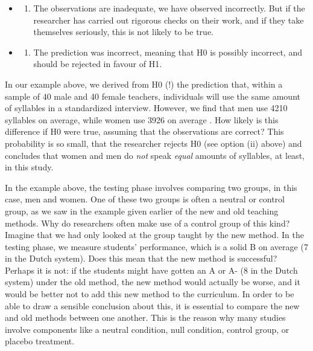 \documentclass[
]{book}
\providecommand{\tightlist}{%
  \setlength{\itemsep}{0pt}\setlength{\parskip}{0pt}}
\begin{document}
\begin{itemize}
\tightlist
\item
  \begin{enumerate}
  \def\labelenumi{(\roman{enumi})}
  \tightlist
  \item
    The observations are inadequate, we have observed incorrectly. But if the researcher has carried out rigorous checks on their work, and if they take themselves seriously, this is not likely to be true.
  \end{enumerate}
\item
  \begin{enumerate}
  \def\labelenumi{(\roman{enumi})}
  \setcounter{enumi}{1}
  \tightlist
  \item
    The prediction was incorrect, meaning that H0 is possibly incorrect, and should be rejected in favour of H1.
  \end{enumerate}
\end{itemize}

In our example above, we derived from H0 (!) the prediction that, within a sample of 40 male and 40 female teachers, individuals will use the same amount of syllables in a standardized interview. However, we find that men use 4210 syllables on average, while women use 3926 on average \citep[p.1112]{Quene08}. How likely is this difference if H0 were true, assuming that the observations are correct? This probability is so small, that the researcher rejects H0 (see option (ii) above) and concludes that women and men do \emph{not} speak \emph{equal} amounts of syllables, at least, in this study.

In the example above, the testing phase involves comparing two groups, in this case, men and women. One of these two groups is often a neutral or control group, as we saw in the example given earlier of the new and old teaching methods. Why do researchers often make use of a control group of this kind? Imagine that we had only looked at the group taught by the new method. In the testing phase, we measure students' performance, which is a solid B on average (7 in the Dutch system). Does this mean that the new method is successful? Perhaps it is not: if the students might have gotten an A or A- (8 in the Dutch system) under the old method, the new method would actually be worse, and it would be better not to add this new method to the curriculum. In order to be able to draw a sensible conclusion about this, it is essential to compare the new and old methods between one another. This is the reason why many studies involve components like a neutral condition, null condition, control group, or placebo treatment.
\end{document}
